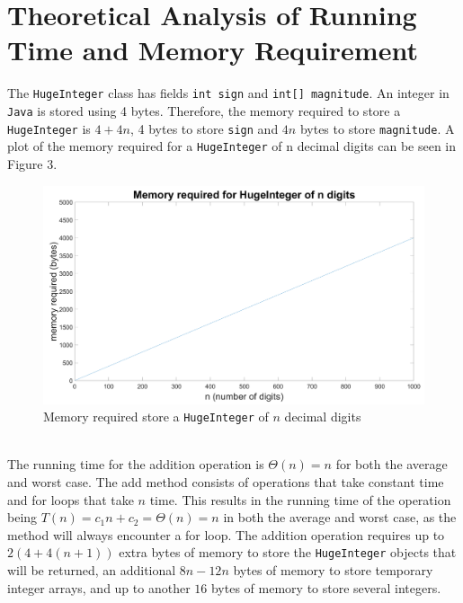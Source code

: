 \documentclass[12pt]{article}
\newcommand{\code}[1]{\texttt{#1}}
\begin{document}
\section*{Theoretical Analysis of Running Time and Memory Requirement}
The \code{HugeInteger} class has fields \code{int sign} and \code{int[] magnitude}. An integer in \code{Java} is stored using 4 bytes. Therefore, the memory required to store a \code{HugeInteger} is $4+4n$, 4 bytes to store \code{sign} and $4n$ bytes to store \code{magnitude}. A plot of the memory required for a \code{HugeInteger} of n decimal digits can be seen in Figure 3.
\begin{figure}[h!]
    \centering
    \includegraphics[width=\textwidth]{memoryplot.png}
    \caption{Memory required store a \code{HugeInteger} of $n$ decimal digits}
\end{figure} \\
The running time for the addition operation is $\Theta(n)=n$ for both the average and worst case. The add method consists of operations that take constant time and for loops that take $n$ time. This results in the running time of the operation being $T(n) = c_1n + c_2 = \Theta(n)=n$ in both the average and worst case, as the method will always encounter a for loop. The addition operation requires up to $2(4+4(n+1))$ extra bytes of memory to store the \code{HugeInteger} objects that will be returned, an additional $8n-12n$ bytes of memory to store temporary integer arrays, and up to another $16$ bytes of memory to store several integers. 
\end{document}
